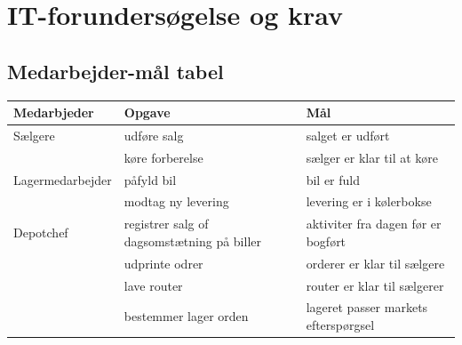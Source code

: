 \section{IT-forundersøgelse og krav}\label{sec:preinvestigation}

\subsection{Medarbejder-mål tabel}\label{mmt}
\begin{center}
\begin{tabular}{ |p{100pt}|p{100pt}|p{100pt}| }
    \hline
    Medarbjeder & Opgave & Mål \\
    \hline\hline
    Sælgere
    & udføre salg & salget er udført \\
    \hline
    & køre forberelse & sælger er klar til at køre \\
    \hline
    Lagermedarbejder
    & påfyld bil & bil er fuld \\
    \hline
    & modtag ny levering & levering er i kølerbokse \\
    \hline
    Depotchef
    & registrer salg of dagsomstætning på biller & aktiviter fra dagen før er bogført \\
    \hline
    & udprinte odrer & orderer er klar til sælgere \\
    \hline
    & lave router & router er klar til sælgerer \\
    \hline
    & bestemmer lager orden & lageret passer markets efterspørgsel \\
    \hline
\end{tabular}
\end{center}

